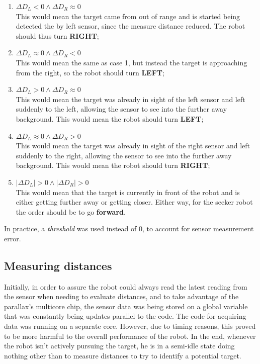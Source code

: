 \documentclass[sigconf,nonacm]{acmart}
\begin{document}
\begin{enumerate}
     \item $\Delta D_L<0 \wedge \Delta D_R \approx 0$ \\ This would mean the
     target came from out of range and is started being detected the by left
     sensor, since the measure distance reduced. The robot should thus
     turn \textbf{RIGHT};
     
     \item $\Delta D_L\approx 0\wedge \Delta D_R < 0$ \\ This would mean the same
     as case 1, but instead the target is approaching from the right, so the
     robot should turn \textbf{LEFT};

     \item $\Delta D_L>0\wedge \Delta D_R \approx 0$ \\ This would mean the
     target was already in sight of the left sensor and left suddenly to the
     left, allowing the sensor to see into the further away background. This
     would mean the robot should turn \textbf{LEFT};
     
     \item $\Delta D_L\approx 0 \wedge \Delta D_R > 0$ \\ This would mean the
     target was already in sight of the right sensor and left suddenly to the
     right, allowing the sensor to see into the further away background. This
     would mean the robot should turn \textbf{RIGHT};

     \item $|\Delta D_L|>0\wedge |\Delta D_R| > 0$ \\ This would mean that the
     target is currently in front of the robot and is either getting further
     away or getting closer. Either way, for the seeker robot the order should
     be to go \textbf{forward}.
\end{enumerate}

In practice, a \textit{threshold} was used instead of 0, to account for sensor
measurement error.


\subsection{Measuring distances}

Initially, in order to assure the robot could always read the latest reading from the
sensor when needing to evaluate distances, and to take advantage of the
parallax's multicore chip, the sensor data was being stored on a global variable
that was constantly being updates parallel to the code. The code for acquiring
data was running on a separate core. 
However, due to timing reasons, this proved to be more harmful to the overall
performance of the robot. In the end, whenever the robot isn't actively pursuing
the target, he is in a semi-idle state doing nothing other than to measure
distances to try to identify a potential target.
\end{document}
